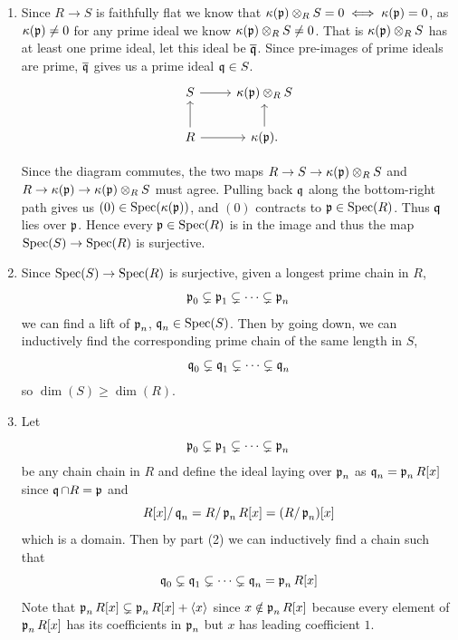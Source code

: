 \documentclass[Notebook.tex]{subfiles}
\begin{document}
\begin{solution}
    \bbni
    \begin{enumerate}
        \item Since $R \to S$ is faithfully flat we know that $\kappa(\fp) \otimes_R S = 0 \iff \kappa(\fp) = 0$, as $\kappa(\fp) \neq 0$ for any prime ideal we know $\kappa(\fp) \otimes_R S \neq 0$. That is $\kappa(\fp) \otimes_R S$ has at least one prime ideal, let this ideal be $\overline{\fq}$. Since pre-images of prime ideals are prime, $\overline{\fq}$ gives us a prime ideal $\fq \in S$. 
        \[\begin{tikzcd}
            S \arrow[r] & \kappa(\mathfrak{p})\otimes_R S \\
            R \arrow[u] \arrow[r] & \kappa(\mathfrak{p}). \arrow[u]
        \end{tikzcd}\]
        
        Since the diagram commutes, the two maps $R \to S \to \kappa(\fp) \otimes_R S$ and $R \to \kappa(\fp) \to \kappa(\fp) \otimes_R S$ must agree. Pulling back $\fq$ along the bottom-right path gives us  $(0) \in \Spec(\kappa(\fp))$, and $(0)$ contracts to $\fp \in \Spec(R)$. Thus $\fq$ lies over $\fp$. Hence every $\fp \in \Spec(R)$ is in the image and thus the map $\Spec(S) \to \Spec(R)$ is surjective. 
        
        
        \item Since $\Spec(S) \to \Spec(R)$ is surjective, given a longest prime chain in $R$, 
        \[\fp_0 \subsetneq \fp_1 \subsetneq \cdots \subsetneq \fp_n\]
        we can find a lift of $\fp_n$, $\fq_n \in \Spec(S)$. Then by going down, we can inductively find the corresponding prime chain of the same length in $S$,
        \[\fq_0 \subsetneq \fq_1 \subsetneq \cdots \subsetneq \fq_n\]
        so $\dim(S) \geq \dim(R)$.

        \item Let 
        \[\fp_0 \subsetneq \fp_1 \subsetneq \cdots \subsetneq \fp_n\] 
        be any chain chain in $R$ and define the ideal laying over $\fp_n$ as $\fq_n = \fp_n R[x]$ since $\fq \cap R = \fp$ and 
        \[R[x] / \fq_n = R/\fp_nR[x] = (R/\fp_n)[x]\]
        which is a domain. Then by part (2) we can inductively find a chain such that 
        \[\fq_0 \subsetneq \fq_1 \subsetneq \cdots \subsetneq \fq_n = \fp_n R[x]\]
        Note that $\fp_n R[x] \subsetneq \fp_n R[x] + \langle x \rangle$ since $x \notin \fp_nR[x]$ because every element of $\fp_n R[x]$ has its coefficients in $\fp_n$ but $x$ has leading coefficient $1$. 
        

\end{enumerate}
\end{solution}
\end{document}
